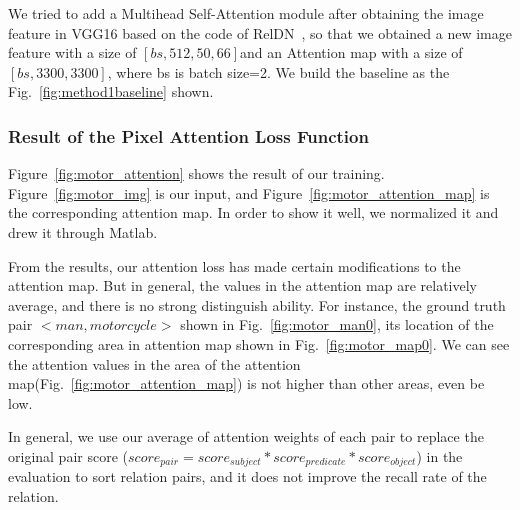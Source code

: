 We tried to add a Multihead Self-Attention module after obtaining the image feature in VGG16 based on the code of RelDN~\cite{zhang2019graphical},  so that we obtained a new image feature with a size of $ [bs, 512, 50, 66]  $and an  Attention map with a size of $ [bs, 3300, 3300] $, where bs is batch size=2. We build the baseline as the Fig.~\ref{fig:method1baseline} shown.

\subsubsection{Result of the Pixel Attention Loss  Function}
Figure~\ref{fig:motor_attention} shows the result of our training. Figure~\ref{fig:motor_img} is our input, and Figure~\ref{fig:motor_attention_map} is the corresponding attention map. In order to show it well, we normalized it and drew it through Matlab.

From the results, our attention loss has made certain modifications to the attention map. But in general, the values in the attention map are relatively average, and there is no strong distinguish ability. For instance, the ground truth pair $ <man, motorcycle>  $ shown in Fig.~\ref{fig:motor_man0}, its location of the corresponding area in attention map shown in Fig.~\ref{fig:motor_map0}. We can see the attention values in the area of the attention map(Fig.~\ref{fig:motor_attention_map}) is not higher than other areas, even be low.

In general, we use our  average of attention weights  of each pair to replace the original pair score ($ score_{pair}=score_{subject }*score_{predicate}* score_{object} $) in the evaluation to sort relation pairs, and it does not improve the recall rate of the relation.

